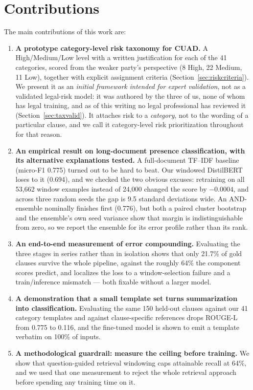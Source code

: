 \section{Contributions}
The main contributions of this work are:
\begin{enumerate}[itemsep=2pt]
  \item \textbf{A prototype category-level risk taxonomy for CUAD.} A High/Medium/Low level with a written justification for each of the 41 categories, scored from the weaker party's perspective (8 High, 22 Medium, 11 Low), together with explicit assignment criteria (Section~\ref{sec:riskcriteria}). We present it as an \emph{initial framework intended for expert validation}, not as a validated legal-risk model: it was authored by the three of us, none of whom has legal training, and as of this writing no legal professional has reviewed it (Section~\ref{sec:taxvalid}). It attaches risk to a \emph{category}, not to the wording of a particular clause, and we call it category-level risk prioritization throughout for that reason.
  \item \textbf{An empirical result on long-document presence classification, with its alternative explanations tested.} A full-document TF--IDF baseline (micro-F1 0.775) turned out to be hard to beat. Our windowed DistilBERT loses to it (0.694), and we checked the two obvious excuses: retraining on all 53{,}662 window examples instead of 24{,}000 changed the score by $-0.0004$, and across three random seeds the gap is 9.5 standard deviations wide. An AND-ensemble nominally finishes first (0.776), but both a paired cluster bootstrap and the ensemble's own seed variance show that margin is indistinguishable from zero, so we report the ensemble for its error profile rather than its rank.
  \item \textbf{An end-to-end measurement of error compounding.} Evaluating the three stages in series rather than in isolation shows that only 21.7\% of gold clauses survive the whole pipeline, against the roughly 64\% the component scores predict, and localizes the loss to a window-selection failure and a train/inference mismatch --- both fixable without a larger model.
  \item \textbf{A demonstration that a small template set turns summarization into classification.} Evaluating the same 150 held-out clauses against our 41 category templates and against clause-specific references drops ROUGE-L from 0.775 to 0.116, and the fine-tuned model is shown to emit a template verbatim on 100\% of inputs.
  \item \textbf{A methodological guardrail: measure the ceiling before training.} We show that question-guided retrieval windowing caps attainable recall at 64\%, and we used that one measurement to reject the whole retrieval approach before spending any training time on it.

\end{enumerate}
